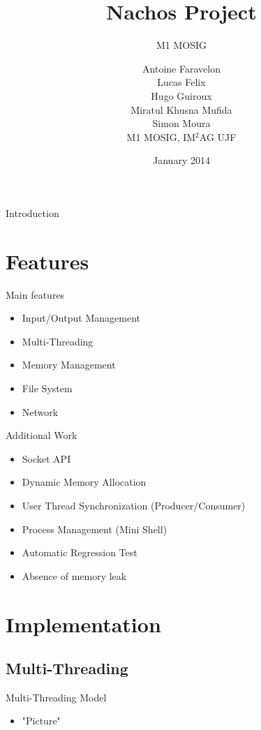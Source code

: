 \documentclass{beamer}
\title{Nachos Project}
\subtitle{M1 MOSIG}
\author{Antoine Faravelon
\\
Lucas Felix
\\
Hugo Guiroux
\\
Miratul Khusna Mufida
\\
Simon Moura
\\
M1 MOSIG, IM$^2$AG UJF 
}
\date{January 2014}
\begin{document}
\frame{\titlepage} 

\begin{frame}
    \tableofcontents
\end{frame}

\begin{frame}{Introduction}
\end{frame}

\section{Features}

\begin{frame}{Main features}
  \begin{itemize}
    \item Input/Output Management
    \item Multi-Threading
    \item Memory Management
    \item File System
    \item Network
  \end{itemize}
\end{frame}

\begin{frame}{Additional Work}
  \begin{itemize}
	\item Socket API 
	\item Dynamic Memory Allocation
	\item User Thread Synchronization (Producer/Consumer)
    \item Process Management (Mini Shell)
    \item Automatic Regression Test 
    \item Absence of memory leak
  \end{itemize}
\end{frame}

\section{Implementation}

\subsection{Multi-Threading}
\begin{frame}{Multi-Threading Model}
  \begin{itemize}
    \item "Picture"
  \end{itemize}
\end{frame}
\end{document}
